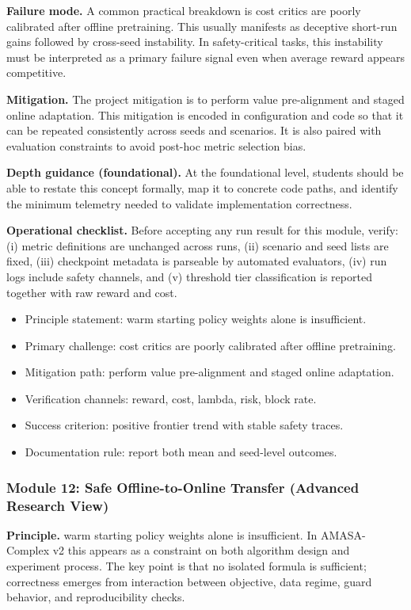 \documentclass[conference]{IEEEtran}
\begin{document}
\textbf{Failure mode.} A common practical breakdown is cost critics are poorly calibrated after offline pretraining. This usually manifests as deceptive short-run gains followed by cross-seed instability. In safety-critical tasks, this instability must be interpreted as a primary failure signal even when average reward appears competitive.

\textbf{Mitigation.} The project mitigation is to perform value pre-alignment and staged online adaptation. This mitigation is encoded in configuration and code so that it can be repeated consistently across seeds and scenarios. It is also paired with evaluation constraints to avoid post-hoc metric selection bias.

\textbf{Depth guidance (foundational).} At the foundational level, students should be able to restate this concept formally, map it to concrete code paths, and identify the minimum telemetry needed to validate implementation correctness.

\textbf{Operational checklist.} Before accepting any run result for this module, verify: (i) metric definitions are unchanged across runs, (ii) scenario and seed lists are fixed, (iii) checkpoint metadata is parseable by automated evaluators, (iv) run logs include safety channels, and (v) threshold tier classification is reported together with raw reward and cost.

\begin{itemize}[leftmargin=*]
  \item Principle statement: warm starting policy weights alone is insufficient.
  \item Primary challenge: cost critics are poorly calibrated after offline pretraining.
  \item Mitigation path: perform value pre-alignment and staged online adaptation.
  \item Verification channels: reward, cost, lambda, risk, block rate.
  \item Success criterion: positive frontier trend with stable safety traces.
  \item Documentation rule: report both mean and seed-level outcomes.
\end{itemize}


\subsubsection{Module 12: Safe Offline-to-Online Transfer (Advanced Research View)}
\textbf{Principle.} warm starting policy weights alone is insufficient. In AMASA-Complex v2 this appears as a constraint on both algorithm design and experiment process. The key point is that no isolated formula is sufficient; correctness emerges from interaction between objective, data regime, guard behavior, and reproducibility checks.
\end{document}
